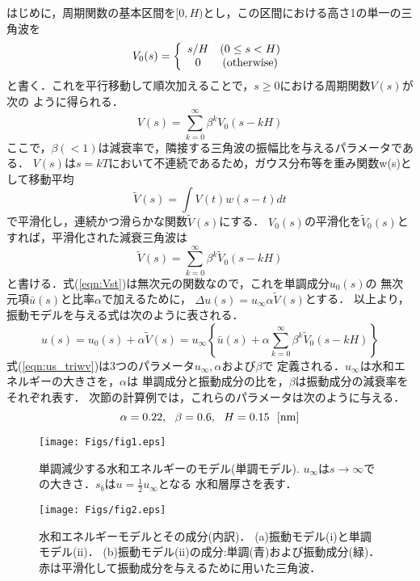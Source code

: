 はじめに，周期関数の基本区間を$[0,H)$とし，この区間における高さ1の単一の三角波を
\begin{equation}
	V_0(s)=\left\{
		\begin{array}{cc}
			s/H & (0\leq s < H) \\
			0 & ({\rm otherwise})
		\end{array}
	\right.
	\label{eqn:V0}
\end{equation}
と書く．これを平行移動して順次加えることで，$s\geq 0$における周期関数$V(s)$が次の
ように得られる．
\begin{equation}
	V(s)=\sum_{k=0}^{\infty} \beta ^{k} V_0(s-kH)
	\label{eqn:Vs}
\end{equation}
ここで，$\beta(<1)$は減衰率で，隣接する三角波の振幅比を与えるパラメータである．
$V(s)$は$s=kT$において不連続であるため，ガウス分布等を重み関数w(s)として移動平均
\begin{equation}
	\tilde V(s)=\int V(t)w(s-t)dt
	\label{eqn:mv_ave}
\end{equation}
で平滑化し，連続かつ滑らかな関数$\tilde V(s)$にする．
$V_0(s)$の平滑化を$\tilde V_0(s)$とすれば，平滑化された減衰三角波は
\begin{equation}
	\tilde V(s)=\sum_{k=0}^{\infty} \beta ^{k} \tilde V_0(s-kH)
	\label{eqn:Vst}
\end{equation}
と書ける．式(\ref{eqn:Vst})は無次元の関数なので，これを単調成分$u_0(s)$の
無次元項$\bar{u}(s)$と比率$\alpha$で加えるために，
$\Delta u(s)=u_\infty\alpha \tilde V(s)$とする．
以上より，振動モデルを与える式は次のように表される．
\begin{equation}
	u(s)=u_0(s)+ \alpha \tilde V(s)= u_{\infty}\left\{ 
	\bar{u}(s)+ \alpha \sum_{k=0}^{\infty} \beta ^{k} \tilde V_0(s-kH)
	\right\}
	\label{eqn:us_triwv}
\end{equation}
式(\ref{eqn:us_triwv})は3つのパラメータ$u_{\infty},\alpha$および$\beta$で
定義される．$u_{\infty}$は水和エネルギーの大きさを，$\alpha$は
単調成分と振動成分の比を，$\beta$は振動成分の減衰率をそれぞれ表す．
次節の計算例では，これらのパラメータは次のように与える．
\begin{equation}
	\alpha=0.22, \ \ \beta=0.6, \ \ H=0.15 \ \ [{\rm nm}]
	\label{eqn:}
\end{equation}
\begin{figure}[h]
	\begin{center}
	\texttt{[image: Figs/fig1.eps]} 
	\end{center}
	\caption{
		単調減少する水和エネルギーのモデル(単調モデル).
		$u_{\infty}$は$s\rightarrow \infty$での大きさ．$s_b$は$u=\frac{1}{2}u_{\infty}$となる
		水和層厚さを表す．
	} 
	\label{fig:fig1}
\end{figure}
\begin{figure}[h]
	\begin{center}
	\texttt{[image: Figs/fig2.eps]} 
	\end{center}
	\caption{
		水和エネルギーモデルとその成分(内訳)．
		(a)振動モデル(i)と単調モデル(ii)．
		(b)振動モデル(ii)の成分:単調(青)および振動成分(緑)．
		赤は平滑化して振動成分を与えるために用いた三角波．
	} 
	\label{fig:fig2}
\end{figure}
